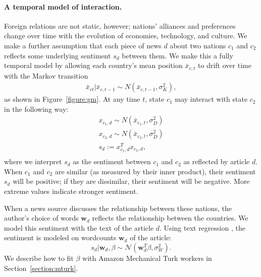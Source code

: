 \paragraph{A temporal model of interaction.}
Foreign relations are not static, however; nations' alliances and
preferences change over time with the evolution of economies,
technology, and culture.  We make a further assumption that each piece
of news $d$ about two nations $c_1$ and $c_2$ reflects some underlying
sentiment $s_d$ between them.  We make this a fully temporal model by
allowing each country's mean position $\bar x_{c,t}$ to drift over
time with the Markov transition
\begin{align}
  \bar x_{ct} | \bar x_{c,t-1} \sim N(\bar x_{c,t-1}, \sigma_K^2),
\end{align}
as shown in Figure~\ref{figure:gm}. At any time $t$, state $c_1$ may interact with state $c_2$ in the following way:
\begin{align}
  x_{c_1,d} \sim N(\bar x_{c_1, t}, \sigma_D^2) \nonumber \\
  x_{c_2,d} \sim N(\bar x_{c_2, t}, \sigma_D^2) \nonumber \\
  s_d := x_{c_1,d}^T x_{c_2,d}, \nonumber \\
\label{equation:sentiment}
\end{align}
where we interpret $s_d$ as the sentiment between $c_1$ and $c_2$ as
reflected by article $d$.  When $c_1$ and $c_2$ are similar (as
measured by their inner product), their sentiment $s_d$ will be
positive; if they are dissimilar, their sentiment will be negative.
More extreme values indicate stronger sentiment.


\label{section:text_regression}
When a news source discusses the relationship between these nations,
the author's choice of words $\bm w_d$ reflects the relationship
between the countries.  We model this sentiment with the text of the
article $d$.  Using text regression \cite{kogan:2009}, the sentiment is modeled on wordcounts $\bm w_d$ of the article:
\[
  s_d | \bm w_d, \beta \sim \mathcal{N}( \bm w_d^T \beta , \sigma_W^2 ).
\]
We describe how to fit $\beta$ with Amazon Mechanical Turk workers in
Section~\ref{section:mturk}.


